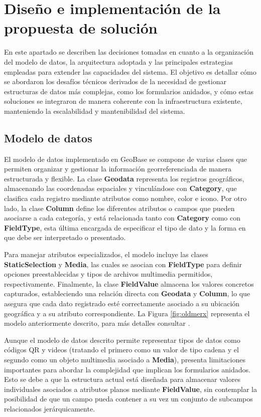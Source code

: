 \documentclass[12pt, a4paper]{book}
\begin{document}
\chapter{Diseño e implementación de la propuesta de solución}

En este apartado se describen las decisiones tomadas en cuanto a la organización del modelo de datos, la arquitectura adoptada y las principales estrategias empleadas para extender las capacidades del sistema. El objetivo es detallar cómo se abordaron los desafíos técnicos derivados de la necesidad de gestionar estructuras de datos más complejas, como los formularios anidados, y cómo estas soluciones se integraron de manera coherente con la infraestructura existente, manteniendo la escalabilidad y mantenibilidad del sistema.

\section{Modelo de datos}

El modelo de datos implementado en GeoBase se compone de varias clases que permiten organizar y gestionar la información georreferenciada de manera estructurada y flexible. La clase \textbf{Geodata} representa los registros geográficos, almacenando las coordenadas espaciales y vinculándose con \textbf{Category}, que clasifica cada registro mediante atributos como nombre, color e icono. Por otro lado, la clase \textbf{Column} define los diferentes atributos o campos que pueden asociarse a cada categoría, y está relacionada tanto con \textbf{Category} como con \textbf{FieldType}, esta última encargada de especificar el tipo de dato y la forma en que debe ser interpretado o presentado.

Para manejar atributos especializados, el modelo incluye las clases \textbf{StaticSelection} y \textbf{Media}, las cuales se asocian con \textbf{FieldType} para definir opciones preestablecidas y tipos de archivos multimedia permitidos, respectivamente. Finalmente, la clase \textbf{FieldValue} almacena los valores concretos capturados, estableciendo una relación directa con \textbf{Geodata} y \textbf{Column}, lo que asegura que cada dato registrado esté correctamente asociado a su ubicación geográfica y a su atributo correspondiente. La Figura \ref{fig:oldmerx} representa el modelo anteriormente descrito, para más detalles consultar \cite{garcia2024}.

Aunque el modelo de datos descrito permite representar tipos de datos como códigos QR y videos (tratando el primero como un valor de tipo cadena y el segundo como un objeto multimedia asociado a \textbf{Media}), presenta limitaciones importantes para abordar la complejidad que implican los formularios anidados. Esto se debe a que la estructura actual está diseñada para almacenar valores individuales asociados a atributos planos mediante \textbf{FieldValue}, sin contemplar la posibilidad de que un campo pueda contener a su vez un conjunto de subcampos relacionados jerárquicamente.
\end{document}
